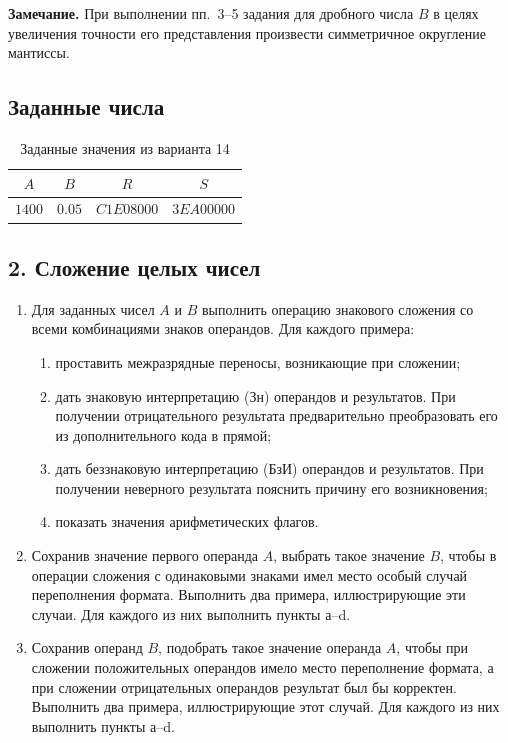 \noindent\textbf{Замечание.}
При выполнении пп.~3--5 задания для дробного числа $B$ в целях
увеличения точности его представления произвести симметричное
округление мантиссы.

\subsection*{Заданные числа}

\begin{table}[htbp]
    \centering
    \caption{Заданные значения из варианта 14}
    \begin{tabular}{|c|c|c|c|}
		$A$ & $B$ & $R$ & $S$ \\
		\hline
		$1400$ & $0.05$ & $C1E08000$ & $3EA00000$ \\
		
    \end{tabular}
\end{table}


\subsection*{2. Сложение целых чисел}

\begin{enumerate}
    \item Для заданных чисел $A$ и $B$ выполнить операцию знакового
    сложения со всеми комбинациями знаков операндов. Для каждого
    примера:
    \begin{enumerate}
        \item проставить межразрядные переносы, возникающие при сложении;
        \item дать знаковую интерпретацию (Зн) операндов и результатов.
        При получении отрицательного результата предварительно
        преобразовать его из дополнительного кода в прямой;
        \item дать беззнаковую интерпретацию (БзИ) операндов и
        результатов. При получении неверного результата пояснить
        причину его возникновения;
        \item показать значения арифметических флагов.
    \end{enumerate}

    \item Сохранив значение первого операнда $A$, выбрать такое
    значение $B$, чтобы в операции сложения с одинаковыми знаками
    имел место особый случай переполнения формата. Выполнить два
    примера, иллюстрирующие эти случаи. Для каждого из них выполнить
    пункты а--d.

    \item Сохранив операнд $B$, подобрать такое значение операнда $A$,
    чтобы при сложении положительных операндов имело место
    переполнение формата, а при сложении отрицательных операндов
    результат был бы корректен. Выполнить два примера,
    иллюстрирующие этот случай. Для каждого из них выполнить
    пункты а--d.
\end{enumerate}

